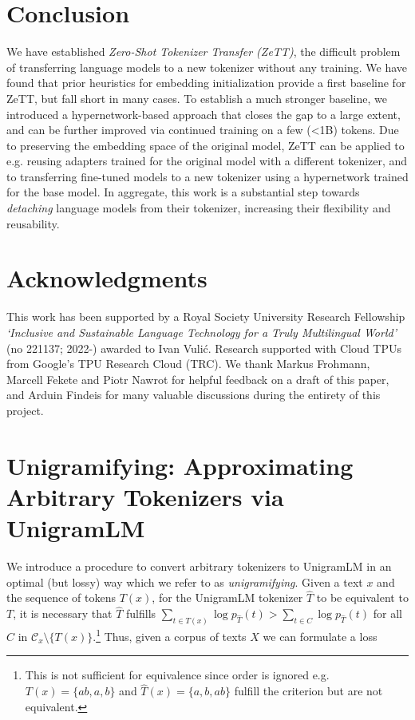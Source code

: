 \documentclass{article}
\begin{document}
\section{Conclusion}
\label{sec:conclusion}

We have established \textit{Zero-Shot Tokenizer Transfer (ZeTT)}, the difficult problem of transferring language models to a new tokenizer without any training. We have found that prior heuristics for embedding initialization provide a first baseline for ZeTT, but fall short in many cases. To establish a much stronger baseline, we introduced a hypernetwork-based approach that closes the gap to a large extent, and can be further improved via continued training on a few (<1B) tokens. Due to preserving the embedding space of the original model, ZeTT can be applied to e.g. reusing adapters trained for the original model with a different tokenizer, and to transferring fine-tuned models to a new tokenizer using a hypernetwork trained for the base model. In aggregate, this work is a substantial step towards \textit{detaching} language models from their tokenizer, increasing their flexibility and reusability.

\section*{Acknowledgments}
This work has been supported by a Royal Society University Research Fellowship \textit{‘Inclusive and Sustainable Language Technology for a Truly Multilingual World’} (no 221137; 2022-) awarded to Ivan Vuli\'{c}. Research supported with Cloud TPUs from Google’s TPU Research Cloud (TRC). We thank Markus Frohmann, Marcell Fekete and Piotr Nawrot for helpful feedback on a draft of this paper, and Arduin Findeis for many valuable discussions during the entirety of this project.


{
\small



}

\appendix

\section{Unigramifying: Approximating Arbitrary Tokenizers via UnigramLM}
\label{appendix:unigramifying}

We introduce a procedure to convert arbitrary tokenizers to UnigramLM in an optimal (but lossy) way which we refer to as \textit{unigramifying}. Given a text $x$ and the sequence of tokens $T(x)$, for the UnigramLM tokenizer $\hat{T}$ to be equivalent to $T$, it is necessary that $\hat{T}$ fulfills $\sum_{t \in T(x)} \log p_{\hat{T}}(t) > \sum_{t \in C} \log p_{\hat{T}}(t)$ for all $C$ in $\mathcal{C}_x \setminus \{T(x)\}$.\footnote{This is not sufficient for equivalence since order is ignored e.g. $T(x) = \{ab, a, b\}$ and $\hat{T}(x) = \{a, b, ab\}$ fulfill the criterion but are not equivalent.} Thus, given a corpus of texts $X$ we can formulate a loss
\end{document}
